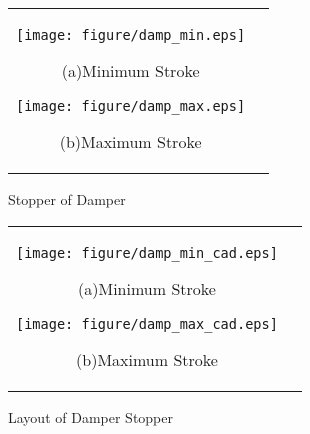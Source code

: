 \documentclass[a4paper,12pt]{article_vdlab_sotsuron}
\begin{document}
\vspace*{10mm}
\begin{figure}[h!]
  \begin{tabular}{cc}
  \begin{minipage}{0.5\hsize}
  \begin{center} 
    \texttt{[image: figure/damp\_min.eps]}
    \end{center}
    \begin{center}
    \vspace{3mm}
    \ (a)Minimum Stroke\
    \end{center}
  \end{minipage}
  \begin{minipage}{0.5\hsize}
     \begin{center}
      \texttt{[image: figure/damp\_max.eps]}
      \end{center}
      \begin{center}
      \vspace{3mm}
      \ (b)Maximum Stroke\
    \end{center}
  \end{minipage}
  \end{tabular}
  \vspace*{3mm}
  \caption{Stopper of Damper}
    \label{fig:damp_stop}
\end{figure}
 
\vspace*{10mm}
\begin{figure}[h!]
  \begin{tabular}{cc}
  \begin{minipage}{0.5\hsize}
  \begin{center} 
    \texttt{[image: figure/damp\_min\_cad.eps]}
    \end{center}
    \begin{center}
    \vspace{3mm}
    \ (a)Minimum Stroke\
    \end{center}
  \end{minipage}
  \begin{minipage}{0.5\hsize}
     \begin{center}
      \texttt{[image: figure/damp\_max\_cad.eps]}
      \end{center}
      \begin{center}
      \vspace{3mm}
      \ (b)Maximum Stroke\
    \end{center}
  \end{minipage}
  \end{tabular}
  \vspace*{3mm}
  \caption{Layout of Damper Stopper}
    \label{fig:damp_stop_cad}
\end{figure}
\end{document}
